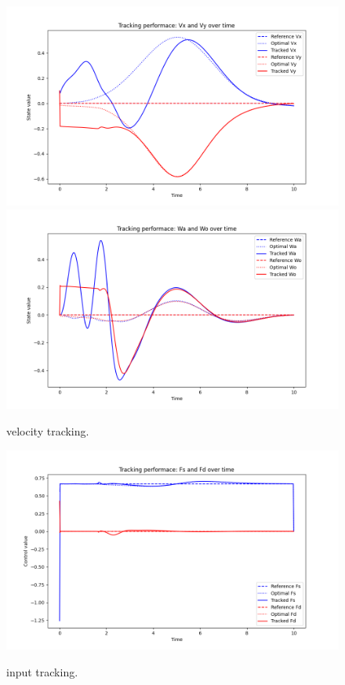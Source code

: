 \begin{figure}[H]
  \centering
  \includegraphics[width=1\textwidth]{pictures/tracking_vx_vy.png}\hfill \\
  \includegraphics[width=1\textwidth]{pictures/tracking_omega.png}\hfill
  \caption{velocity tracking.}
  \label{fig:Reference trajectory}
\end{figure}

\begin{figure}[H]
  \centering
  \includegraphics[width=1\textwidth]{pictures/tracking_input.png}\hfill \\
  \caption{input tracking.}
  \label{fig:Reference trajectory}
\end{figure}
